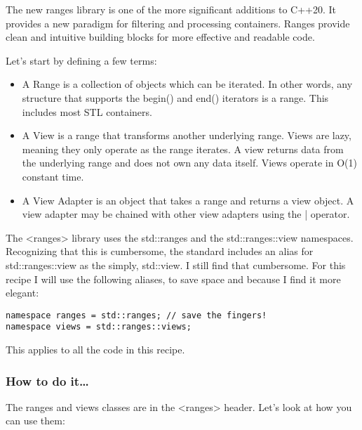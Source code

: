 
The new ranges library is one of the more significant additions to C++20. It provides a new paradigm for filtering and processing containers. Ranges provide clean and intuitive building blocks for more effective and readable code.

Let's start by defining a few terms:

\begin{itemize}
\item 
A Range is a collection of objects which can be iterated. In other words, any structure that supports the begin() and end() iterators is a range. This includes most STL containers.

\item 
A View is a range that transforms another underlying range. Views are lazy, meaning they only operate as the range iterates. A view returns data from the underlying range and does not own any data itself. Views operate in O(1) constant time.

\item 
A View Adapter is an object that takes a range and returns a view object.
A view adapter may be chained with other view adapters using the | operator.
\end{itemize}

\begin{tcolorbox}[colback=webgreen!5!white,colframe=webgreen!75!black,title=Note]
The <ranges> library uses the std::ranges and the std::ranges::view namespaces. Recognizing that this is cumbersome, the standard includes an alias for std::ranges::view as the simply, std::view. I still find that cumbersome. For this recipe I will use the following aliases, to save space and because I find it more elegant:

\begin{lstlisting}[style=styleCXX]
namespace ranges = std::ranges; // save the fingers!
namespace views = std::ranges::views;
\end{lstlisting}

This applies to all the code in this recipe.
\end{tcolorbox}

\subsubsection{How to do it…}

The ranges and views classes are in the <ranges> header. Let's look at how you can use them:

